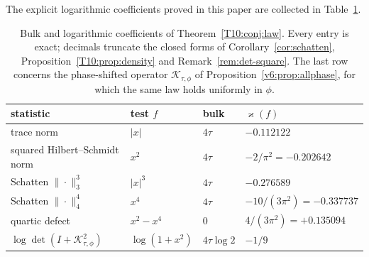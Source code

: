 The explicit logarithmic coefficients proved in this paper are collected in
Table~\ref{tab:coefficients}.

\begin{table}[htbp]
\centering
\begin{tabular}{llll}
\hline
statistic & test $f$ & bulk & $\varkappa(f)$\\
\hline
trace norm & $|x|$ & $4\tau$ & $-0.112122$\\
squared Hilbert--Schmidt norm & $x^2$ & $4\tau$ & $-2/\pi^2=-0.202642$\\
Schatten $\|\cdot\|_3^3$ & $|x|^3$ & $4\tau$ & $-0.276589$\\
Schatten $\|\cdot\|_4^4$ & $x^4$ & $4\tau$ & $-10/(3\pi^2)=-0.337737$\\
quartic defect & $x^2-x^4$ & $0$ & $4/(3\pi^2)=+0.135094$\\
$\log\det(I+\mathcal K_{\tau,\phi}^2)$ & $\log(1+x^2)$ & $4\tau\log2$ & $-1/9$\\
\hline
\end{tabular}
\caption{Bulk and logarithmic coefficients of Theorem~\ref{T10:conj:law}.
Every entry is exact; decimals truncate the closed forms of
Corollary~\ref{cor:schatten},
Proposition~\ref{T10:prop:density} and Remark~\ref{rem:det-square}.  The
last row concerns the phase-shifted operator $\mathcal K_{\tau,\phi}$ of
Proposition~\ref{v6:prop:allphase}, for which the same law holds uniformly
in $\phi$.}
\label{tab:coefficients}
\end{table}

